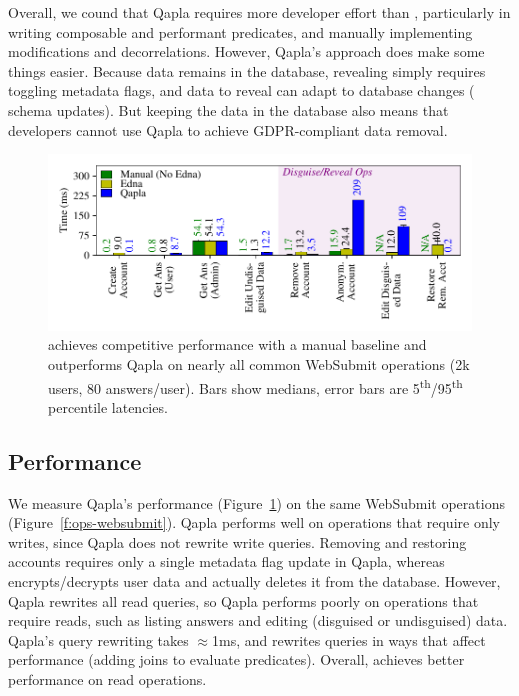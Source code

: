 Overall, we cound that Qapla requires more developer effort than \sys, particularly in writing
composable and performant predicates, and manually implementing modifications
and decorrelations. However, Qapla's approach does make some things easier.
%
Because data remains in the database, revealing simply requires toggling
metadata flags, and data to reveal can adapt to database changes (\eg
schema updates). But keeping the data in the database also means that developers cannot use Qapla to
achieve GDPR-compliant data removal. %

%
\begin{figure}[t]
  \centering
      \includegraphics[width=\columnwidth]{figs/websubmit_qapla_op_stats}
    \caption[Latencies of Websubmit operations when implemented with
    Qapla vs. with \sys.]{\sys achieves competitive performance with a manual baseline and
    outperforms Qapla on nearly all common WebSubmit operations (2k users,
    80 answers/user).
    Bars show medians, error bars are 5\textsuperscript{th}/95\textsuperscript{th}
    percentile latencies.}
  \label{f:qapla_ws_opstats}
\end{figure}

%
\subsection{Performance}
\label{s:eval-qapla-perf}
%
We measure Qapla's performance (Figure~\ref{f:qapla_ws_opstats}) on the same
WebSubmit operations (Figure~\ref{f:ops-websubmit}).
%
Qapla performs well on operations that require only writes, since Qapla does not
rewrite write queries.  Removing and restoring accounts requires only a single
metadata flag update in Qapla, whereas \sys encrypts/decrypts user data and
actually deletes it from the database.
%
However, Qapla rewrites all read queries, so Qapla performs poorly on operations
that require reads, such as listing answers and editing (disguised or
undisguised) data.
%
Qapla's query rewriting takes $\approx$1ms, and rewrites  queries in
ways that affect performance (\eg adding joins to evaluate predicates).
%
Overall, \sys achieves better performance on read operations.

%
